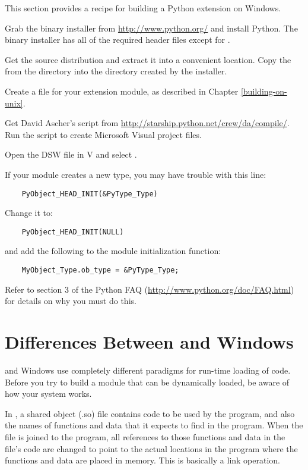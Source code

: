 \documentclass{manual}
\begin{document}
This section provides a recipe for building a Python extension on
Windows.

Grab the binary installer from \url{http://www.python.org/} and
install Python.  The binary installer has all of the required header
files except for .

Get the source distribution and extract it into a convenient location.
Copy the  from the  directory into the
 directory created by the installer.

Create a  file for your extension module, as described in
Chapter \ref{building-on-unix}.

Get David Ascher's  script from
\url{http://starship.python.net/crew/da/compile/}.  Run the script to
create Microsoft Visual \Cpp{} project files.

Open the DSW file in V\Cpp{} and select .

If your module creates a new type, you may have trouble with this line:

\begin{verbatim}
    PyObject_HEAD_INIT(&PyType_Type)
\end{verbatim}

Change it to:

\begin{verbatim}
    PyObject_HEAD_INIT(NULL)
\end{verbatim}

and add the following to the module initialization function:

\begin{verbatim}
    MyObject_Type.ob_type = &PyType_Type;
\end{verbatim}

Refer to section 3 of the Python FAQ
(\url{http://www.python.org/doc/FAQ.html}) for details on why you must
do this.


\section{Differences Between \UNIX{} and Windows
         \label{dynamic-linking}}


\UNIX{} and Windows use completely different paradigms for run-time
loading of code.  Before you try to build a module that can be
dynamically loaded, be aware of how your system works.

In \UNIX{}, a shared object (.so) file contains code to be used by the
program, and also the names of functions and data that it expects to
find in the program.  When the file is joined to the program, all
references to those functions and data in the file's code are changed
to point to the actual locations in the program where the functions
and data are placed in memory.  This is basically a link operation.
\end{document}
